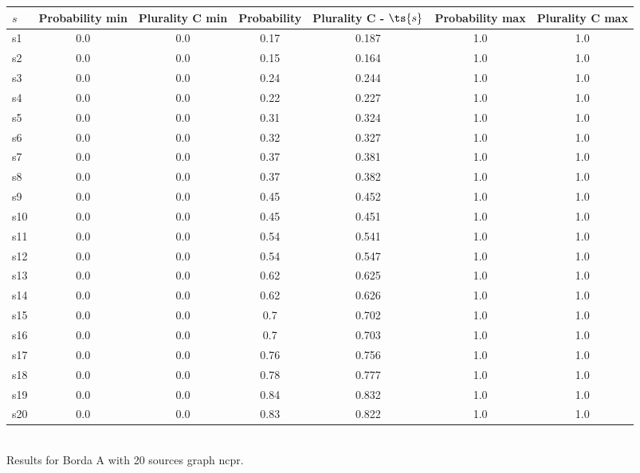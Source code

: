 \documentclass{article}
\begin{document}
\noindent\begin{tabular}{|l|c|c|c|c|c|c|}
\hline
$s$& Probability min & Plurality C min & Probability & Plurality C - $\ts{s}$ & Probability max & Plurality C max\\
\hline
s1 &0.0 & 0.0 & 0.17 & 0.187 & 1.0 & 1.0\\
\hline
s2 &0.0 & 0.0 & 0.15 & 0.164 & 1.0 & 1.0\\
\hline
s3 &0.0 & 0.0 & 0.24 & 0.244 & 1.0 & 1.0\\
\hline
s4 &0.0 & 0.0 & 0.22 & 0.227 & 1.0 & 1.0\\
\hline
s5 &0.0 & 0.0 & 0.31 & 0.324 & 1.0 & 1.0\\
\hline
s6 &0.0 & 0.0 & 0.32 & 0.327 & 1.0 & 1.0\\
\hline
s7 &0.0 & 0.0 & 0.37 & 0.381 & 1.0 & 1.0\\
\hline
s8 &0.0 & 0.0 & 0.37 & 0.382 & 1.0 & 1.0\\
\hline
s9 &0.0 & 0.0 & 0.45 & 0.452 & 1.0 & 1.0\\
\hline
s10 &0.0 & 0.0 & 0.45 & 0.451 & 1.0 & 1.0\\
\hline
s11 &0.0 & 0.0 & 0.54 & 0.541 & 1.0 & 1.0\\
\hline
s12 &0.0 & 0.0 & 0.54 & 0.547 & 1.0 & 1.0\\
\hline
s13 &0.0 & 0.0 & 0.62 & 0.625 & 1.0 & 1.0\\
\hline
s14 &0.0 & 0.0 & 0.62 & 0.626 & 1.0 & 1.0\\
\hline
s15 &0.0 & 0.0 & 0.7 & 0.702 & 1.0 & 1.0\\
\hline
s16 &0.0 & 0.0 & 0.7 & 0.703 & 1.0 & 1.0\\
\hline
s17 &0.0 & 0.0 & 0.76 & 0.756 & 1.0 & 1.0\\
\hline
s18 &0.0 & 0.0 & 0.78 & 0.777 & 1.0 & 1.0\\
\hline
s19 &0.0 & 0.0 & 0.84 & 0.832 & 1.0 & 1.0\\
\hline
s20 &0.0 & 0.0 & 0.83 & 0.822 & 1.0 & 1.0\\
\hline
\end{tabular}\\

\noindent Results for Borda A with 20 sources graph ncpr.
\end{document}
